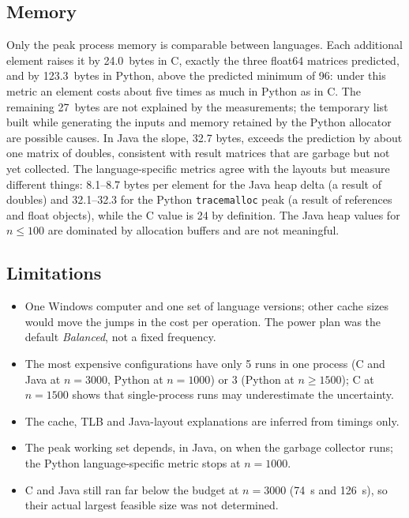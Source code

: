 \documentclass[12pt,a4paper]{article}
\begin{document}
\subsection{Memory}

Only the peak process memory is comparable between languages. Each additional element
raises it by 24.0~bytes in C, exactly the three float64 matrices predicted, and by
123.3~bytes in Python, above the predicted minimum of 96: under this metric an element
costs about five times as much in Python as in C. The remaining 27~bytes are not
explained by the measurements; the temporary list built while generating the inputs and
memory retained by the Python allocator are possible causes. In Java the slope, 32.7
bytes, exceeds the prediction by about one matrix of doubles, consistent with result
matrices that are garbage but not yet collected. The language-specific metrics agree with
the layouts but measure different things: 8.1--8.7 bytes per element for the Java heap
delta (a result of doubles) and 32.1--32.3 for the Python \texttt{tracemalloc} peak (a
result of references and float objects), while the C value is 24 by definition. The Java
heap values for $n \le 100$ are dominated by allocation buffers and are not meaningful.

\subsection{Limitations}

\begin{itemize}
    \item One Windows computer and one set of language versions; other cache sizes would
    move the jumps in the cost per operation. The power plan was the default
    \textit{Balanced}, not a fixed frequency.
    \item The most expensive configurations have only 5 runs in one process (C and Java at
    $n = 3000$, Python at $n = 1000$) or 3 (Python at $n \ge 1500$); C at $n = 1500$
    shows that single-process runs may underestimate the uncertainty.
    \item The cache, TLB and Java-layout explanations are inferred from timings only.
    \item The peak working set depends, in Java, on when the garbage collector runs; the
    Python language-specific metric stops at $n = 1000$.
    \item C and Java still ran far below the budget at $n = 3000$ (74~s and 126~s), so
    their actual largest feasible size was not determined.
\end{itemize}
\end{document}
